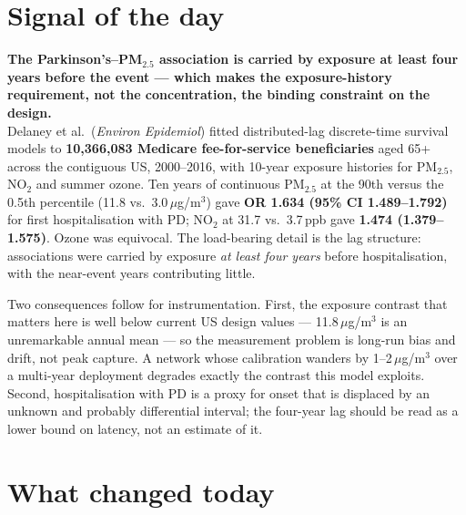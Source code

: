 \documentclass[10pt]{article}
\begin{document}
\vspace{6mm}

\section*{\sffamily\bfseries\color{Deep}Signal of the day}
\vspace{-1.5mm}{\color{Amber}\rule{\linewidth}{1.1pt}}\vspace{2.5mm}

\begin{keybox}
{\sffamily\bfseries\small\color{Deep}The Parkinson's--PM$_{2.5}$ association is carried by
exposure at least four years before the event --- which makes the exposure-history
requirement, not the concentration, the binding constraint on the design.}\\[1.4mm]
\footnotesize
Delaney et al.\ (\textit{Environ Epidemiol}) fitted distributed-lag discrete-time survival
models to \textbf{10{,}366{,}083 Medicare fee-for-service beneficiaries} aged 65+ across the
contiguous US, 2000--2016, with 10-year exposure histories for PM$_{2.5}$, NO$_2$ and
summer ozone. Ten years of continuous PM$_{2.5}$ at the 90th versus the 0.5th percentile
(11.8 vs.\ 3.0\,$\mu$g/m$^3$) gave \textbf{OR 1.634 (95\% CI 1.489--1.792)} for first
hospitalisation with PD; NO$_2$ at 31.7 vs.\ 3.7\,ppb gave \textbf{1.474 (1.379--1.575)}.
Ozone was equivocal. The load-bearing detail is the lag structure: associations were
carried by exposure \emph{at least four years} before hospitalisation, with the
near-event years contributing little.

Two consequences follow for instrumentation. First, the exposure contrast that matters
here is well below current US design values --- 11.8\,$\mu$g/m$^3$ is an unremarkable
annual mean --- so the measurement problem is long-run bias and drift, not peak capture.
A network whose calibration wanders by 1--2\,$\mu$g/m$^3$ over a multi-year deployment
degrades exactly the contrast this model exploits. Second, hospitalisation with PD is a
proxy for onset that is displaced by an unknown and probably differential interval; the
four-year lag should be read as a lower bound on latency, not an estimate of it.
\end{keybox}

\vspace{3mm}

\section*{\sffamily\bfseries\color{Deep}What changed today}
\vspace{-1.5mm}{\color{Amber}\rule{\linewidth}{1.1pt}}\vspace{2.5mm}
\end{document}
